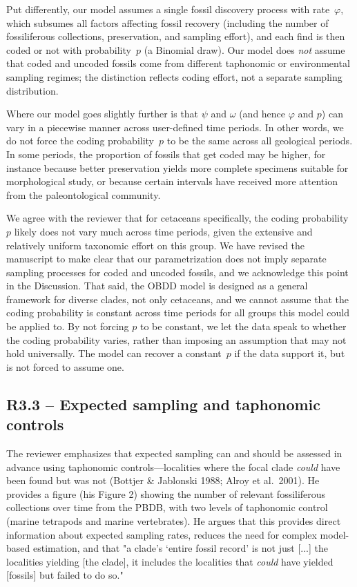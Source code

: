 \documentclass[11pt]{article}
\newcommand{\response}[1]{\noindent\textcolor{resp}{#1}\medskip}
\begin{document}
\response{Put differently, our model assumes a single fossil discovery process with rate~$\varphi$, which subsumes all factors affecting fossil recovery (including the number of fossiliferous collections, preservation, and sampling effort), and each find is then coded or not with probability~$p$ (a Binomial draw). Our model does \emph{not} assume that coded and uncoded fossils come from different taphonomic or environmental sampling regimes; the distinction reflects coding effort, not a separate sampling distribution.}

\response{Where our model goes slightly further is that $\psi$ and $\omega$ (and hence $\varphi$ and $p$) can vary in a piecewise manner across user-defined time periods. In other words, we do not force the coding probability~$p$ to be the same across all geological periods. In some periods, the proportion of fossils that get coded may be higher, for instance because better preservation yields more complete specimens suitable for morphological study, or because certain intervals have received more attention from the paleontological community.}

\response{We agree with the reviewer that for cetaceans specifically, the coding probability~$p$ likely does not vary much across time periods, given the extensive and relatively uniform taxonomic effort on this group. We have revised the manuscript to make clear that our parametrization does not imply separate sampling processes for coded and uncoded fossils, and we acknowledge this point in the Discussion. That said, the OBDD model is designed as a general framework for diverse clades, not only cetaceans, and we cannot assume that the coding probability is constant across time periods for all groups this model could be applied to. By not forcing $p$ to be constant, we let the data speak to whether the coding probability varies, rather than imposing an assumption that may not hold universally. The model can recover a constant~$p$ if the data support it, but is not forced to assume one.}

\subsection*{R3.3 -- Expected sampling and taphonomic controls}

The reviewer emphasizes that expected sampling can and should be assessed in advance using taphonomic controls---localities where the focal clade \emph{could} have been found but was not (Bottjer \& Jablonski 1988; Alroy et al.\ 2001). He provides a figure (his Figure 2) showing the number of relevant fossiliferous collections over time from the PBDB, with two levels of taphonomic control (marine tetrapods and marine vertebrates). He argues that this provides direct information about expected sampling rates, reduces the need for complex model-based estimation, and that "a clade's `entire fossil record' is not just [...] the localities yielding [the clade], it includes the localities that \emph{could} have yielded [fossils] but failed to do so."
\end{document}
